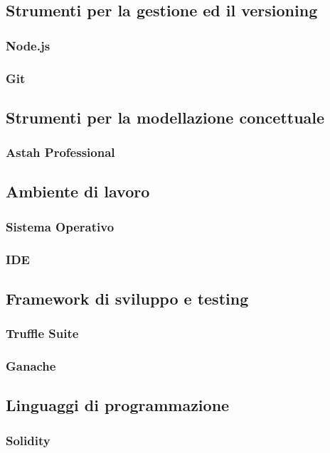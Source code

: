 \subsection{Strumenti per la gestione ed il versioning}
\subsubsection{Node.js}
\subsubsection{Git}

\subsection{Strumenti per la modellazione concettuale}
\subsubsection{Astah Professional}

\subsection{Ambiente di lavoro}
\subsubsection{Sistema Operativo}
\subsubsection{IDE}

\subsection{Framework di sviluppo e testing}
\subsubsection{Truffle Suite}
\subsubsection{Ganache}

\subsection{Linguaggi di programmazione}
\subsubsection{Solidity}
